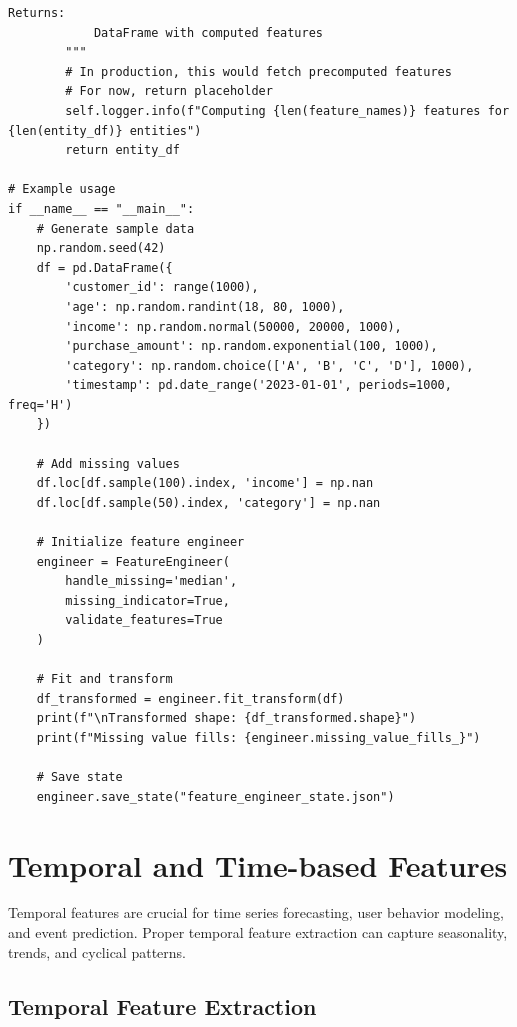 \begin{lstlisting}[style=python, caption={Production Feature Engineering Framework}]
        Returns:
            DataFrame with computed features
        """
        # In production, this would fetch precomputed features
        # For now, return placeholder
        self.logger.info(f"Computing {len(feature_names)} features for {len(entity_df)} entities")
        return entity_df

# Example usage
if __name__ == "__main__":
    # Generate sample data
    np.random.seed(42)
    df = pd.DataFrame({
        'customer_id': range(1000),
        'age': np.random.randint(18, 80, 1000),
        'income': np.random.normal(50000, 20000, 1000),
        'purchase_amount': np.random.exponential(100, 1000),
        'category': np.random.choice(['A', 'B', 'C', 'D'], 1000),
        'timestamp': pd.date_range('2023-01-01', periods=1000, freq='H')
    })

    # Add missing values
    df.loc[df.sample(100).index, 'income'] = np.nan
    df.loc[df.sample(50).index, 'category'] = np.nan

    # Initialize feature engineer
    engineer = FeatureEngineer(
        handle_missing='median',
        missing_indicator=True,
        validate_features=True
    )

    # Fit and transform
    df_transformed = engineer.fit_transform(df)
    print(f"\nTransformed shape: {df_transformed.shape}")
    print(f"Missing value fills: {engineer.missing_value_fills_}")

    # Save state
    engineer.save_state("feature_engineer_state.json")
\end{lstlisting}

\section{Temporal and Time-based Features}

Temporal features are crucial for time series forecasting, user behavior modeling, and event prediction. Proper temporal feature extraction can capture seasonality, trends, and cyclical patterns.

\subsection{Temporal Feature Extraction}

